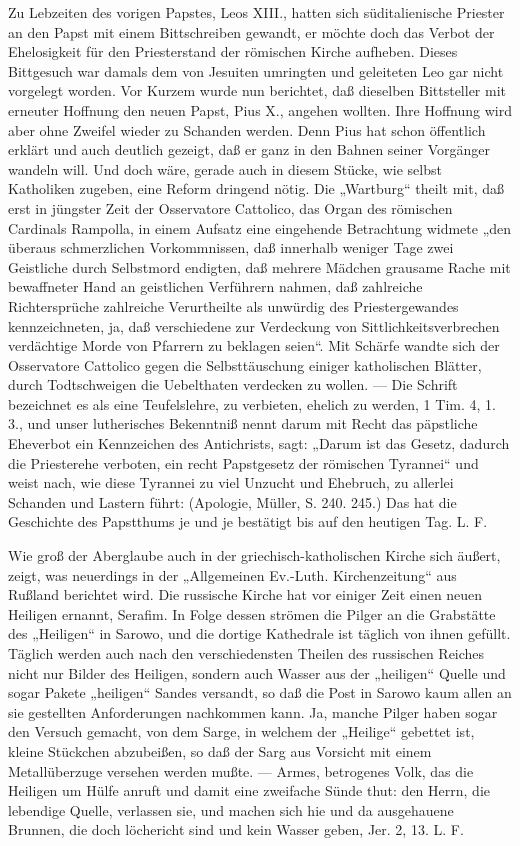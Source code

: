 Zu Lebzeiten des vorigen Papstes, Leos XIII., hatten sich süditalienische Priester an den Papst mit einem Bittschreiben gewandt, er möchte doch das Verbot der Ehelosigkeit für den Priesterstand der römischen Kirche aufheben. Dieses Bittgesuch war damals dem von Jesuiten umringten und geleiteten Leo gar nicht vorgelegt worden. Vor Kurzem wurde nun berichtet, daß dieselben Bittsteller mit erneuter Hoffnung den neuen Papst, Pius X., angehen wollten. Ihre Hoffnung wird aber ohne Zweifel wieder zu Schanden werden. Denn Pius hat schon öffentlich erklärt und auch deutlich gezeigt, daß er ganz in den Bahnen seiner Vorgänger wandeln will. Und doch wäre, gerade auch in diesem Stücke, wie selbst Katholiken zugeben, eine Reform dringend nötig. Die „Wartburg“ theilt mit, daß erst in jüngster Zeit der Osservatore Cattolico, das Organ des römischen Cardinals Rampolla, in einem Aufsatz eine eingehende Betrachtung widmete „den überaus schmerzlichen Vorkommnissen, daß innerhalb weniger Tage zwei Geistliche durch Selbstmord endigten, daß mehrere Mädchen grausame Rache mit bewaffneter Hand an geistlichen Verführern nahmen, daß zahlreiche Richtersprüche zahlreiche Verurtheilte als unwürdig des Priestergewandes kennzeichneten, ja, daß verschiedene zur Verdeckung von Sittlichkeitsverbrechen verdächtige Morde von Pfarrern zu beklagen seien“. Mit Schärfe wandte sich der Osservatore Cattolico gegen die Selbsttäuschung einiger katholischen Blätter, durch Todtschweigen die Uebelthaten verdecken zu wollen. — Die Schrift bezeichnet es als eine Teufelslehre, zu verbieten, ehelich zu werden, 1 Tim. 4, 1. 3., und unser lutherisches Bekenntniß nennt darum mit Recht das päpstliche Eheverbot ein Kennzeichen des Antichrists, sagt: „Darum ist das Gesetz, dadurch die Priesterehe verboten, ein recht Papstgesetz der römischen Tyrannei“ und weist nach, wie diese Tyrannei zu viel Unzucht und Ehebruch, zu allerlei Schanden und Lastern führt: (Apologie, Müller, S. 240. 245.) Das hat die Geschichte des Papstthums je und je bestätigt bis auf den heutigen Tag. L. F.

Wie groß der Aberglaube auch in der griechisch-katholischen Kirche sich äußert, zeigt, was neuerdings in der „Allgemeinen Ev.-Luth. Kirchenzeitung“ aus Rußland berichtet wird. Die russische Kirche hat vor einiger Zeit einen neuen Heiligen ernannt, Serafim. In Folge dessen strömen die Pilger an die Grabstätte des „Heiligen“ in Sarowo, und die dortige Kathedrale ist täglich von ihnen gefüllt. Täglich werden auch nach den verschiedensten Theilen des russischen Reiches nicht nur Bilder des Heiligen, sondern auch Wasser aus der „heiligen“ Quelle und sogar Pakete „heiligen“ Sandes versandt, so daß die Post in Sarowo kaum allen an sie gestellten Anforderungen nachkommen kann. Ja, manche Pilger haben sogar den Versuch gemacht, von dem Sarge, in welchem der „Heilige“ gebettet ist, kleine Stückchen abzubeißen, so daß der Sarg aus Vorsicht mit einem Metallüberzuge versehen werden mußte. — Armes, betrogenes Volk, das die Heiligen um Hülfe anruft und damit eine zweifache Sünde thut: den Herrn, die lebendige Quelle, verlassen sie, und machen sich hie und da ausgehauene Brunnen, die doch löchericht sind und kein Wasser geben, Jer. 2, 13. L. F.

